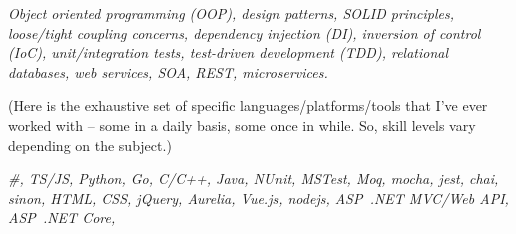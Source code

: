\documentclass[10pt,a4paper]{article}
\begin{document}
\begin{customitemize}
    \item[] 
    \item[] 
    \item[] 
\end{customitemize}
\sectionrule{}

\begin{customitemize}
    \item[] 
    \begin{customitemize}
        \item {\textit{Object oriented programming (OOP), design patterns, SOLID principles,
                        loose/tight coupling concerns, dependency injection (DI), inversion of
                        control (IoC), unit/integration tests, test-driven development (TDD),
                        relational databases, web services, SOA, REST, microservices.
                    }}
    \end{customitemize}
    \item[] 
    \begin{customitemize}
        \item[] {
                    (Here is the exhaustive set of specific languages/platforms/tools
                    that I've ever worked with -- some in a daily basis, some once in while.
                    So, skill levels vary depending on the subject.)
              }
        \item {
                    \textit{
                        \#,
                        TS/JS,
                        Python,
                        Go,
                        C/C++,
                        Java,
                        NUnit,
                        MSTest,
                        Moq,
                        mocha,
                        jest,
                        chai,
                        sinon,
                        HTML,
                        CSS,
                        jQuery,
                        Aurelia,
                        Vue.js,
                        nodejs,
                        ASP~.NET MVC/Web API,
                        ASP~.NET Core,
}}
\end{customitemize}
\end{customitemize}
\end{document}
